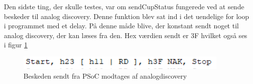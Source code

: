 \documentclass[Rapport/Playerside/RPI_IF/RPI_IF.tex]{subfiles}
\begin{document}
Den sidste ting, der skulle testes, var om sendCupStatus fungerede ved at sende beskeder til analog discovery. Denne funktion blev sat ind i det uendelige for loop i programmet med et delay. På denne måde blive, der konstant sendt noget til analog discovery, der kan læses fra den. Hex værdien sendt er 3F hvilket også ses i figur \ref{fig:sendCupStatus}
\begin{figure}
    \centering 
    \includegraphics[width=0.5\linewidth]{Rapport/Playerside/graphics/RPI_IF/analog_read.PNG}
    \caption{Beskeden sendt fra PSoC modtages af analogdiscovery}
    \label{fig:sendCupStatus}
\end{figure}
\end{document}
